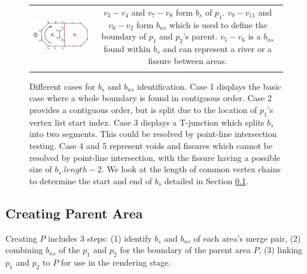 \begin{figure}[p]
\begin{tabularx}{1\linewidth}{c C}
\includegraphics[width=0.3\linewidth, valign=m]{images/case4} &$v_3-v_4$ and $v_7-v_8$ form $b_{s}$ of $p_1$. $v_9-v_{11}$ and $v_0-v_2$ form $b_{ns}$ which is used to define the boundary of $p_1$ and $p_2$'s parent. $v_5-v_6$ is a $b_{ns}$ found within $b_{s}$ and can represent a river or a fissure between areas. \\ \\

\end{tabularx}   


\caption{Different cases for $b_s$ and $b_{ns}$ identification. Case 1 displays the basic case where a whole boundary is found in contiguous order. Case 2 provides a contiguous order, but is split due to the location of $p_1$'s vertex list start index. Case 3 displays a T-junction which splits $b_{s}$ into two segments. This could be resolved by point-line intersection testing. Case 4 and 5 represent voids and fissures which cannot be resolved by point-line intersection, with the fissure having a possible size of $b_s.length-2$. We look at the length of common vertex chains to determine the start and end of $b_s$ detailed in Section \ref{parent}.
} \label{fig:boundary} \vspace{-0.3cm}
\end{figure}

\subsection{Creating Parent Area} \label{parent}
Creating $P$ includes 3 steps: (1) identify $b_{s}$ and $b_{ns}$ of each area's merge pair, (2) combining $b_{ns}$ of the $p_1$ and $p_2$ for the boundary of the parent area $P$, (3) linking $p_1$ and $p_2$ to $P$ for use in the rendering stage.

